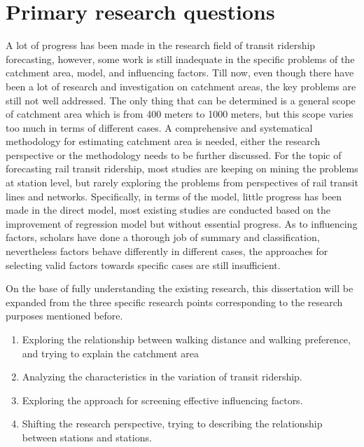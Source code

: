 %
\section{Primary research questions}
A lot of progress has been made in the research field of transit ridership forecasting, however, some work is still inadequate in the specific problems of the catchment area, model, and influencing factors. Till now, even though there have been a lot of research and investigation on catchment areas, the key problems are still not well addressed. The only thing that can be determined is a general scope of catchment area which is from 400 meters to 1000 meters, but this scope varies too much in terms of different cases. A comprehensive and systematical methodology for estimating catchment area is needed, either the research perspective or the methodology needs to be further discussed. For the topic of forecasting rail transit ridership, most studies are keeping on mining the problems at station level, but rarely exploring the problems from perspectives of rail transit lines and networks. Specifically, in terms of the model, little progress has been made in the direct model, most existing studies are conducted based on the improvement of regression model but without essential progress. As to influencing factors, scholars have done a thorough job of summary and classification, nevertheless factors behave differently in different cases, the approaches for selecting valid factors towards specific cases are still insufficient. 

On the base of fully understanding the existing research, this dissertation will be expanded from the three specific research points corresponding to the research purposes mentioned before.

\begin{enumerate}
	\setlength{\parskip}{0\baselineskip} %
	\item Exploring the relationship between walking distance and walking preference, and trying to explain the catchment area
	\item Analyzing the characteristics in the variation of transit ridership.
	\item Exploring the approach for screening effective influencing factors.
	\item Shifting the research perspective, trying to describing the relationship between stations and stations.
	\setlength{\parskip}{0.7\baselineskip} %
\end{enumerate}

